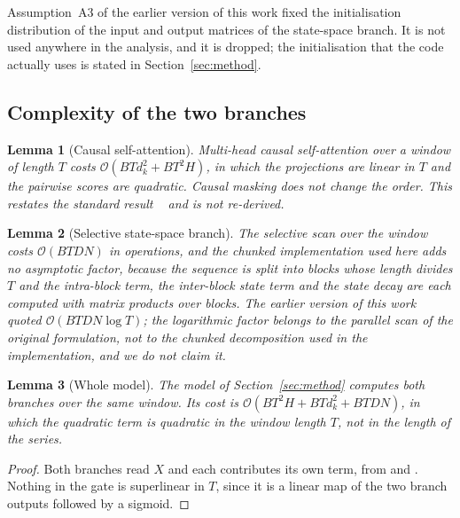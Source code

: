 \documentclass[pdflatex,sn-mathphys-ay]{sn-jnl}
\theoremstyle{thmstyleone}%
\newtheorem{Lemma}{Lemma}[section]%
\theoremstyle{thmstyletwo}%
\theoremstyle{thmstyletwo}%
\begin{document}
Assumption~A3 of the earlier version of this work fixed the initialisation distribution of the
input and output matrices of the state-space branch. It is not used anywhere in the analysis, and it
is dropped; the initialisation that the code actually uses is stated in Section~\ref{sec:method}.

\subsection{Complexity of the two branches}

\begin{Lemma}[Causal self-attention]\label{L1}
	Multi-head causal self-attention over a window of length $T$ costs
	$\mathcal{O}(B T d_k^2 + B T^2 H)$, in which the projections are linear in $T$ and the pairwise
	scores are quadratic. Causal masking does not change the order. This restates the standard result
	~\citep{vaswani2017attention} and is not re-derived.
\end{Lemma}

\begin{Lemma}[Selective state-space branch]\label{L2}
	The selective scan over the window costs $\mathcal{O}(B T D N)$ in operations, and the chunked
	implementation used here adds no asymptotic factor, because the sequence is split into blocks whose
	length divides $T$ and the intra-block term, the inter-block state term and the state decay are
	each computed with matrix products over blocks. The earlier version of this work quoted
	$\mathcal{O}(B T D N \log T)$; the logarithmic factor belongs to the parallel scan of the original
	formulation, not to the chunked decomposition used in the implementation, and we do not claim it.
\end{Lemma}

\begin{Lemma}[Whole model]\label{L3}
	The model of Section~\ref{sec:method} computes both branches over the same window. Its cost is
	$\mathcal{O}(B T^2 H + B T d_k^2 + B T D N)$, in which the quadratic term is quadratic in the
	\emph{window length} $T$, not in the length of the series.
\end{Lemma}

\begin{proof}
	Both branches read $X$ and each contributes its own term, from  and . Nothing in
	the gate is superlinear in $T$, since it is a linear map of the two branch outputs followed by a
	sigmoid.
\end{proof}
\end{document}
